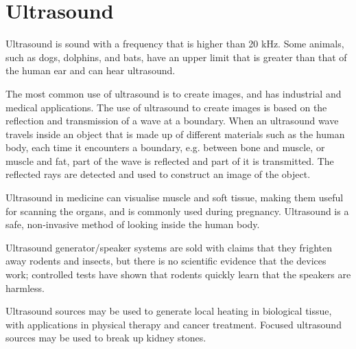 \section{Ultrasound}

Ultrasound is sound with a frequency that is higher than 20 kHz. Some animals, such as dogs, dolphins, and bats, have an upper limit that is greater than that of the human ear and can hear ultrasound.

The most common use of ultrasound is to create images, and has industrial and medical applications. The use of ultrasound to create images is based on the reflection and transmission of a wave at a boundary. When an ultrasound wave travels inside an object that is made up of different materials such as the human body, each time it encounters a boundary, e.g.\@{} between bone and muscle, or muscle and fat, part of the wave is reflected and part of it is transmitted. The reflected rays are detected and used to construct an image of the object.

Ultrasound in medicine can visualise muscle and soft tissue, making them useful for scanning the organs, and is commonly used during pregnancy. Ultrasound is a safe, non-invasive method of looking inside the human body.
\begin{IFact}{Ultrasound generator/speaker systems are sold with claims that they frighten away rodents and insects, but there is no scientific evidence that the devices work; controlled tests have shown that rodents quickly learn that the speakers are harmless.
}\end{IFact}
Ultrasound sources may be used to generate local heating in biological tissue, with applications in physical therapy and cancer treatment. Focused ultrasound sources may be used to break up kidney stones.

